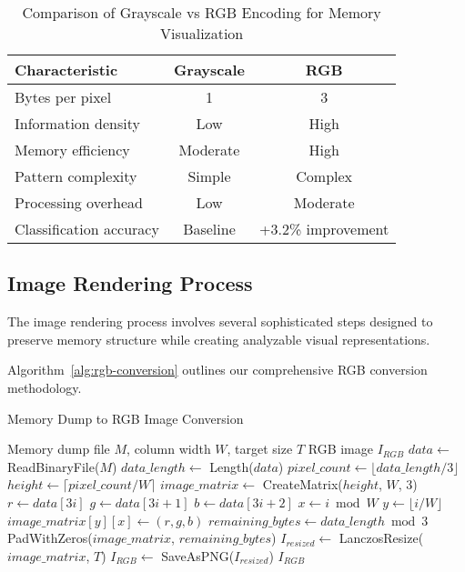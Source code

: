 \begin{table}[!htbp]
    \centering
    \caption{Comparison of Grayscale vs RGB Encoding for Memory Visualization}
    \label{tab:encoding-comparison}
    \begin{tabular}{|l|c|c|}
    \hline
    \textbf{Characteristic} & \textbf{Grayscale} & \textbf{RGB} \\
    \hline
    Bytes per pixel & 1 & 3 \\
    Information density & Low & High \\
    Memory efficiency & Moderate & High \\
    Pattern complexity & Simple & Complex \\
    Processing overhead & Low & Moderate \\
    Classification accuracy & Baseline & +3.2\% improvement \\
    \hline
    \end{tabular}
\end{table}

\subsection{Image Rendering Process}
\label{subsec:rendering-process}

The image rendering process involves several sophisticated steps designed to preserve memory structure while creating analyzable visual representations.

Algorithm~\ref{alg:rgb-conversion} outlines our comprehensive RGB conversion methodology.

\begin{algorithm}[!htbp]
\caption{Memory Dump to RGB Image Conversion}
\label{alg:rgb-conversion}
\begin{algorithmic}[1]
\Require Memory dump file $M$, column width $W$, target size $T$
\Ensure RGB image $I_{RGB}$
\State $data \leftarrow$ ReadBinaryFile($M$)
\State $data\_length \leftarrow$ Length($data$)
\State $pixel\_count \leftarrow \lfloor data\_length / 3 \rfloor$
\State $height \leftarrow \lceil pixel\_count / W \rceil$
\State $image\_matrix \leftarrow$ CreateMatrix($height$, $W$, 3)
    \State $r \leftarrow data[3i]$
    \State $g \leftarrow data[3i + 1]$
    \State $b \leftarrow data[3i + 2]$
    \State $x \leftarrow i \bmod W$
    \State $y \leftarrow \lfloor i / W \rfloor$
    \State $image\_matrix[y][x] \leftarrow (r, g, b)$
\EndFor
{}
    \State $remaining\_bytes \leftarrow data\_length \bmod 3$
    \State PadWithZeros($image\_matrix$, $remaining\_bytes$)
\EndIf
\State $I_{resized} \leftarrow$ LanczosResize($image\_matrix$, $T$)
\State $I_{RGB} \leftarrow$ SaveAsPNG($I_{resized}$)
\Return $I_{RGB}$
\end{algorithmic}
\end{algorithm}


